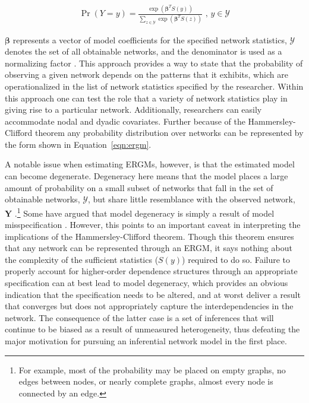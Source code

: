\documentclass[12pt,pdflatex]{elsarticle}
\begin{document}
\begin{align}
\Pr(Y = y) = \frac{ \exp( \bm\beta^{T} S(y)  )  }{ \sum_{z \in \mathcal{Y}} \exp( \bm\beta^{T} S(z)  )  } \text{ ,  } y \in \mathcal{Y}
\label{eqn:ergm}
\end{align}

$\bm\beta$ represents a vector of model coefficients for the specified network statistics, $\mathcal{Y}$ denotes the set of all obtainable networks, and the denominator is used as a normalizing factor \citep{hunter:etal:2008}. This approach provides a way to state that the probability of observing a given network depends on the patterns that it exhibits, which are operationalized in the list of network statistics specified by the researcher. Within this approach one can test the role that a variety of network statistics play in giving rise to a particular network. Additionally, researchers can easily accommodate nodal and dyadic covariates. Further because of the Hammersley-Clifford theorem any probability distribution over networks can be represented by the form shown in Equation~\ref{eqn:ergm}. 

A notable issue when estimating ERGMs, however, is that the estimated model can become degenerate. Degeneracy here means that the model places a large amount of probability on a small subset of networks that fall in the set of obtainable networks, $\mathcal{Y}$, but share little resemblance with the observed network, $\mathbf{Y}$ \citep{schweinberger:2011}.\footnote{For example, most of the probability may be placed on empty graphs, no edges between nodes, or nearly complete graphs, almost every node is connected by an edge.} Some have argued that model degeneracy is simply a result of model misspecification \citep{handcock:2003a,goodreau:etal:2008,handcock:etal:2008}. However, this points to an important caveat in interpreting the implications of the Hammersley-Clifford theorem. Though this theorem ensures that any network can be represented through an ERGM, it says nothing about the complexity of the sufficient statistics ($S(y)$) required to do so. Failure to properly account for higher-order dependence structures through an appropriate specification can at best lead to model degeneracy, which provides an obvious indication that the specification needs to be altered, and at worst deliver a result that converges but does not appropriately capture the interdependencies in the network. The consequence of the latter case is a set of inferences that will continue to be biased as a result of unmeasured heterogeneity, thus defeating the major motivation for pursuing an inferential network model in the first place.
\end{document}
